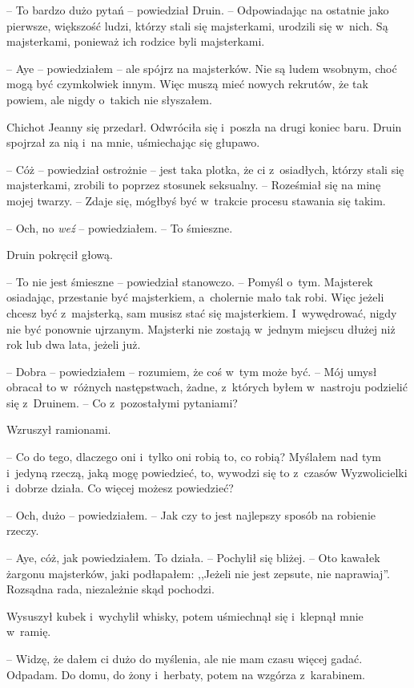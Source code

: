\documentclass[oneside,polish,11pt,sfheadings]{mwbk}
\begin{document}
-- To bardzo dużo pytań -- powiedział Druin. -- Odpowiadając na ostatnie
jako pierwsze, większość ludzi, którzy stali się majsterkami, urodzili
się w~nich. Są majsterkami, ponieważ ich rodzice byli majsterkami.

-- Aye -- powiedziałem -- ale spójrz na majsterków. Nie są ludem wsobnym,
choć mogą być czymkolwiek innym. Więc muszą mieć nowych rekrutów, że tak
powiem, ale nigdy o~takich nie słyszałem.

Chichot Jeanny się przedarł. Odwróciła się i~poszła na drugi koniec
baru. Druin spojrzał za nią i~na mnie, uśmiechając się głupawo.

-- Cóż -- powiedział ostrożnie -- jest taka plotka, że ci z~osiadłych,
którzy stali się majsterkami, zrobili to poprzez stosunek seksualny. -- Roześmiał się na minę mojej twarzy. -- Zdaje się, mógłbyś być w~trakcie
procesu stawania się takim.

-- Och, no \textit{weź} -- powiedziałem. -- To śmieszne.

Druin pokręcił głową. 

-- To nie jest śmieszne -- powiedział stanowczo. -- Pomyśl o~tym. Majsterek osiadając, przestanie być majsterkiem, a~cholernie mało tak robi. Więc jeżeli chcesz być z~majsterką, sam musisz
stać się majsterkiem. I~wywędrować, nigdy nie być ponownie ujrzanym.
Majsterki nie zostają w~jednym miejscu dłużej niż rok lub dwa lata,
jeżeli już.

-- Dobra -- powiedziałem -- rozumiem, że coś w~tym może być. -- Mój umysł
obracał to w~różnych następstwach, żadne, z~których byłem w~nastroju
podzielić się z~Druinem. -- Co z~pozostałymi pytaniami?

Wzruszył ramionami. 

-- Co do tego, dlaczego oni i~tylko oni robią to, co
robią? Myślałem nad tym i~jedyną rzeczą, jaką mogę powiedzieć, to,
wywodzi się to z~czasów Wyzwolicielki i~dobrze działa. Co więcej możesz
powiedzieć?

-- Och, dużo -- powiedziałem. -- Jak czy to jest najlepszy sposób na
robienie rzeczy.

-- Aye, cóż, jak powiedziałem. To działa. -- Pochylił się bliżej. -- Oto
kawałek żargonu majsterków, jaki podłapałem: ,,Jeżeli nie jest zepsute,
nie naprawiaj''. Rozsądna rada, niezależnie skąd pochodzi.

Wysuszył kubek i~wychylił whisky, potem uśmiechnął się i~klepnął mnie w~ramię. 

-- Widzę, że dałem ci dużo do myślenia, ale nie mam czasu więcej
gadać. Odpadam. Do domu, do żony i~herbaty, potem na wzgórza z~karabinem.
\end{document}
